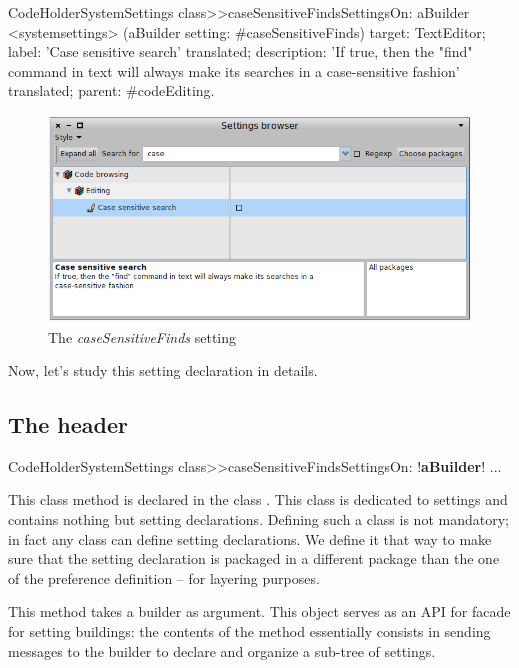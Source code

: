 \documentclass[a4paper,10pt,twoside]{book}
\begin{document}
\begin{code}{}
CodeHolderSystemSettings class>>caseSensitiveFindsSettingsOn: aBuilder
	<systemsettings>
	(aBuilder setting: #caseSensitiveFinds) 
		target: TextEditor;
		label: 'Case sensitive search' translated;
		description: 'If true, then the "find" command in text will always make its searches in a case-sensitive fashion' translated;
		parent: #codeEditing.
\end{code}

\begin{figure}[tbh]
\begin{center}
\includegraphics[scale=0.4]{caseSensitiveFinds_setting_declaration1}
\caption{The \textit{caseSensitiveFinds} setting}
\end{center}
\end{figure}

Now, let's study this setting declaration in details. 

\subsection{The header}
\begin{code}{}
CodeHolderSystemSettings class>>caseSensitiveFindsSettingsOn: !\textbf{aBuilder}!
   ...
\end{code}
This class method is declared in the class . This class is dedicated to settings and contains nothing but setting declarations. Defining such a class is not mandatory; in fact any class can define setting declarations. We define it that way to make sure that the setting declaration is packaged in a different package than the one of the preference definition -- for layering purposes.

This method takes a builder as argument. This object serves as an API for facade for setting buildings: the contents of the method essentially consists in sending messages to the builder to declare and organize a sub-tree of settings.
\end{document}
